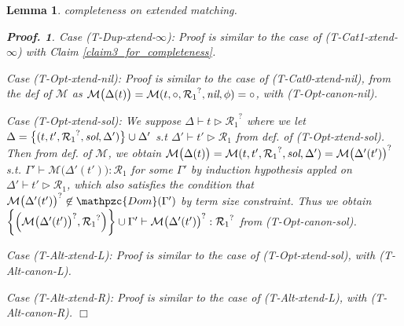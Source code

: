 \documentclass[12pt]{article}
\newtheorem{Lemma}{Lemma}[section]
\newtheorem{Proof}{Proof.}
\begin{document}
\begin{Lemma}{completeness on extended matching.}
\begin{Proof}
    Case (T-Dup-xtend-$\infty$):
    Proof is similar to the case of (T-Cat1-xtend-$\infty$) with Claim
    \ref{claim3_for_completeness}.
    
    Case (T-Opt-xtend-nil):
    Proof is similar to the case of (T-Cat0-xtend-nil), from the def of
    $\mathcal{M}$ as
    $\mathcal{M}\bigl(\Delta(t) \bigr) =
    \mathcal{M}(t, \circ, {\mathcal{R}_1}^?, \text{\it nil}, \phi) =
    \circ$, with (T-Opt-canon-nil).

    Case (T-Opt-xtend-sol):
    We suppose
    $\Delta \vdash t \triangleright {\mathcal{R}_1}^?$ where we let
    $\Delta = \bigl\{(t, t', {\mathcal{R}_1}^?, \text{\it sol}, \Delta')
    \bigr\} \cup \Delta'$ s.t
    $\Delta' \vdash t' \triangleright \mathcal{R}_1$ from def. of
    (T-Opt-xtend-sol). Then from def. of $\mathcal{M}$, we obtain
    $\mathcal{M}\bigl(\Delta(t) \bigr) =
    \mathcal{M}(t, t', {\mathcal{R}_1}^?, \text{\it sol}, \Delta') =
    {\mathcal{M}\bigl(\Delta'(t') \bigr)}^?$ s.t.
    $\Gamma' \vdash \mathcal{M}\bigl(\Delta'(t') \bigr) : \mathcal{R}_1$
    for some $\Gamma'$ by induction hypothesis appled on
    $\Delta' \vdash t' \triangleright \mathcal{R}_1$, which also satisfies
    the condition that
    ${\mathcal{M}\bigl(\Delta'(t') \bigr)}^? \not\in \mathpzc{Dom}(
    \Gamma')$ by term size constraint. Thus we obtain
    $\biggl\{\Bigl({\mathcal{M}\bigl(\Delta'(t') \bigr)}^?,
    {\mathcal{R}_1}^? \Bigr) \biggr\} \cup \Gamma' \vdash
    {\mathcal{M}\bigl(\Delta'(t') \bigr)}^? : {\mathcal{R}_1}^?$ from
    (T-Opt-canon-sol).
    
    Case (T-Alt-xtend-L):
    Proof is similar to the case of (T-Opt-xtend-sol), with
    (T-Alt-canon-L).
    
    Case (T-Alt-xtend-R):
    Proof is similar to the case of (T-Alt-xtend-L), with (T-Alt-canon-R).
    $\Box$
  \end{Proof}
\end{Lemma}
\end{document}
